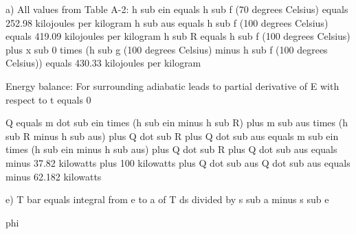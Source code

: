 a) All values from Table A-2:  
h sub ein equals h sub f (70 degrees Celsius) equals 252.98 kilojoules per kilogram  
h sub aus equals h sub f (100 degrees Celsius) equals 419.09 kilojoules per kilogram  
h sub R equals h sub f (100 degrees Celsius) plus x sub 0 times (h sub g (100 degrees Celsius) minus h sub f (100 degrees Celsius)) equals 430.33 kilojoules per kilogram  

Energy balance:  
For surrounding adiabatic leads to partial derivative of E with respect to t equals 0  

Q equals m dot sub ein times (h sub ein minus h sub R) plus m sub aus times (h sub R minus h sub aus) plus Q dot sub R plus Q dot sub aus  
equals m sub ein times (h sub ein minus h sub aus) plus Q dot sub R plus Q dot sub aus  
equals minus 37.82 kilowatts plus 100 kilowatts plus Q dot sub aus  
Q dot sub aus equals minus 62.182 kilowatts  

e) T bar equals integral from e to a of T ds divided by s sub a minus s sub e

phi